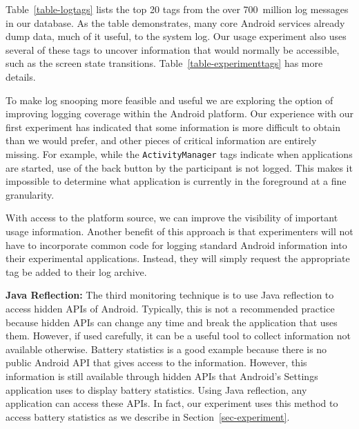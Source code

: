 Table~\ref{table-logtags} lists the top 20 tags from the over 700~million log
messages in our database. As the table demonstrates, many core Android
services already dump data, much of it useful, to the system log. Our usage
experiment also uses several of these tags to uncover information that would
normally be accessible, such as the screen state transitions.
Table~\ref{table-experimenttags} has more details.

To make log snooping more feasible and useful we are exploring the option of
improving logging coverage within the Android platform. Our experience with
our first experiment has indicated that some information is more difficult to
obtain than we would prefer, and other pieces of critical information are
entirely missing. For example, while the \texttt{ActivityManager} tags
indicate when applications are started, use of the back button by the
participant is not logged. This makes it impossible to determine what
application is currently in the foreground at a fine granularity.

With access to the platform source, we can improve the visibility of
important usage information. Another benefit of this approach is that
experimenters will not have to incorporate common code for logging standard
Android information into their experimental applications. Instead, they will
simply request the appropriate tag be added to their log archive.

{\bf Java Reflection:} The third monitoring technique is to use Java
reflection to access hidden APIs of Android. Typically, this is not a
recommended practice because hidden APIs can change any time and break the
application that uses them. However, if used carefully, it can be a useful
tool to collect information not available otherwise. Battery statistics is a
good example because there is no public Android API that gives access to the
information. However, this information is still available through hidden APIs
that Android's Settings application uses to display battery statistics. Using
Java reflection, any application can access these APIs. In fact, our
experiment uses this method to access battery statistics as we describe in
Section~\ref{sec-experiment}.

